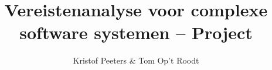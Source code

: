 \documentclass[11pt,a4paper,oneside]{book}
\begin{document}
\frontmatter



\title{Vereistenanalyse voor complexe software systemen -- Project}
\author{Kristof Peeters & Tom Op't Roodt}

\tableofcontents

\mainmatter







\end{document}
